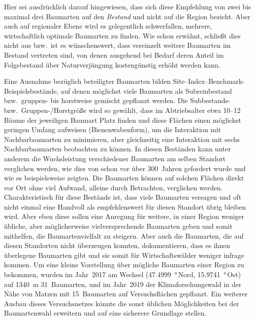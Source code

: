 \documentclass[twocolumn, paper=a4, fontsize=10pt, bibliography=totoc, index=totoc]{scrartcl}
\begin{document}
Hier sei ausdrücklich darauf hingewiesen, dass sich diese Empfehlung von zwei bis
maximal drei Baumarten auf den \emph{Bestand} und nicht auf die Region bezieht.
Aber auch auf regionaler Ebene wird es gelegentlich schwerfallen, mehrere,
wirtschaftlich optimale Baumarten zu finden. Wie schon erwähnt, schließt dies
nicht aus bzw.\ ist es wünschenswert, dass vereinzelt weitere Baumarten
im Bestand vertreten sind, von denen ausgehend bei Bedarf deren Anteil im
Folgebestand über Naturverjüngung kostengünstig erhöht werden kann.

Eine Ausnahme bezüglich beteiligter Baumarten bilden Site--Index--Benchmark-Beispielsbestände, auf denen möglichst viele Baumarten als Subreinbestand bzw.\
gruppen- bis horstweise gemischt gepflanzt werden. Die Subbestands- bzw.\
Gruppen-/Horstgröße wird so gewählt, dass im Abtriebsalter etwa 10--12 Bäume
der jeweiligen Baumart Platz finden und diese Flächen einen möglichst geringen
Umfang aufweisen (Bienenwabenform), um die Interaktion mit Nachbarbaumarten zu
minimieren, aber gleichzeitig eine Interaktion mit sechs Nachbarbaumarten
beobachten zu können. In diesen Beständen kann unter anderem die Wuchsleistung
verschiedener Baumarten am selben Standort verglichen werden, wie dies von
\citet[S.~300]{reaumur1721ertragstafel} schon vor über 300~Jahren gefordert wurde und
wie es beispielsweise \citet{mayer1970anbauversuch} zeigten. Die Baumarten können auf
solchen Flächen direkt vor Ort ohne viel Aufwand, alleine durch Betrachten,
verglichen werden. Charakteristisch für diese Bestände ist, dass viele
Baumarten versagen und oft nicht einmal eine Handvoll als empfehlenswert für
diesen Standort übrig bleiben wird. Aber eben diese sollen eine Anregung für
weitere, in einer Region weniger übliche, aber möglicherweise vielversprechende
Baumarten geben und somit mithelfen, die Baumartenvielfalt zu steigern. Aber auch
die Baumarten, die auf diesen Standorten nicht überzeugen konnten,
dokumentieren, dass es ihnen überlegene Baumarten gibt und sie somit für
Wirtschaftswälder weniger infrage kommen. Um eine kleine Vorstellung über
mögliche Baumarten einer Region zu bekommen, wurden im Jahr~2017 am Wechsel
(\qty{47.4999}{\degree}\,Nord, \qty{15.9741}{\degree}\,Ost) auf \qty{1340}{\metre} 31~Baumarten, und
im Jahr~2019 der Klimaforschungswald in der Nähe von Matzen mit 15~Baumarten
auf Versuchsflächen gepflanzt. Ein weiterer Ausbau dieses Versuchsnetzes könnte
die sonst üblichen Möglichkeiten bei der Baumartenwahl erweitern und auf eine
sicherere Grundlage stellen.
\end{document}
